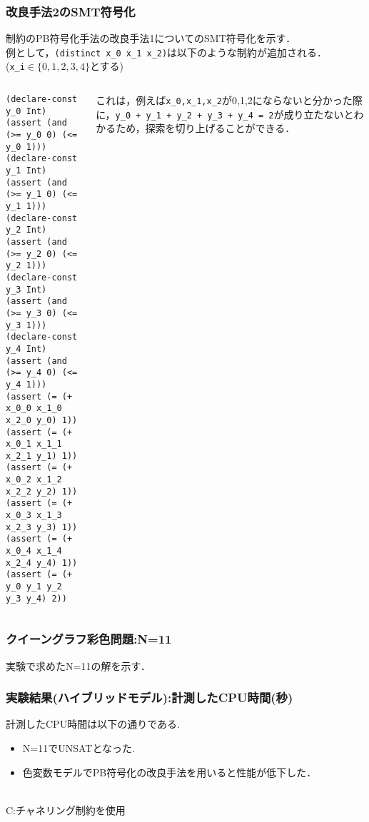 \begin{frame}[fragile]\footnotesize
    \frametitle{改良手法2のSMT符号化}
    \distinct 制約のPB符号化手法の改良手法1についてのSMT符号化を示す．\\
    例として，\verb|(distinct x_0 x_1 x_2)|は以下のような制約が追加される．\\
    (\verb|x_i|$\in \{0,1,2,3,4\}$とする)

    \begin{columns}
        \begin{column}{0.5\textwidth}
            \begin{exampleblock}{}\scriptsize
\begin{verbatim}
(declare-const y_0 Int)
(assert (and (>= y_0 0) (<= y_0 1)))
(declare-const y_1 Int)
(assert (and (>= y_1 0) (<= y_1 1)))
(declare-const y_2 Int)
(assert (and (>= y_2 0) (<= y_2 1)))
(declare-const y_3 Int)
(assert (and (>= y_3 0) (<= y_3 1)))
(declare-const y_4 Int)
(assert (and (>= y_4 0) (<= y_4 1)))
(assert (= (+ x_0_0 x_1_0 x_2_0 y_0) 1))
(assert (= (+ x_0_1 x_1_1 x_2_1 y_1) 1))
(assert (= (+ x_0_2 x_1_2 x_2_2 y_2) 1))
(assert (= (+ x_0_3 x_1_3 x_2_3 y_3) 1))
(assert (= (+ x_0_4 x_1_4 x_2_4 y_4) 1))
(assert (= (+ y_0 y_1 y_2 y_3 y_4) 2))
\end{verbatim}
            \end{exampleblock}
        \end{column}
        \begin{column}{0.5\textwidth}\scriptsize
            これは，例えば\verb|x_0,x_1,x_2|が0,1,2にならないと分かった際に，\verb|y_0 + y_1 + y_2 + y_3 + y_4 = 2|が成り立たないとわかるため，探索を切り上げることができる．
        \end{column}
    \end{columns}

\end{frame}

\begin{frame}
    \frametitle{クイーングラフ彩色問題:N=11}
    実験で求めたN=11の解を示す．
    
\end{frame}


\begin{frame}
    \frametitle{実験結果(ハイブリッドモデル):計測したCPU時間(秒)}
    計測したCPU時間は以下の通りである.
    \begin{block}{}
        {\tiny  }
    \end{block}
    \begin{itemize}
        \item N=11でUNSATとなった.
        \item 色変数モデルでPB符号化の改良手法を用いると性能が低下した．
    \end{itemize}
    \\
    {\footnotesize C:チャネリング制約を使用}\\
\end{frame}





\backupend

